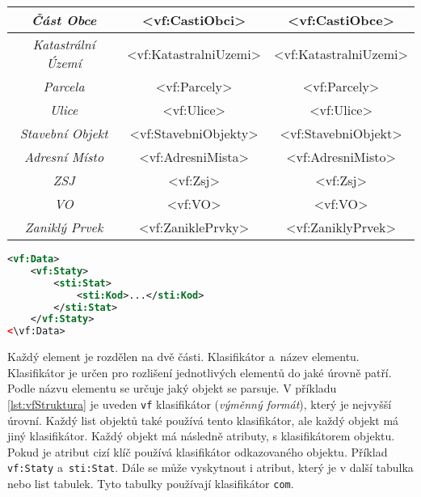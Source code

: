 \begin{table}[!h]
\begin{tabular}{|c|c|c|}
    \textit{Část Obce}                   & \textless{}vf:CastiObci\textgreater{}          & \textless{}vf:CastiObce\textgreater{}         \\ \hline
    \textit{Katastrální Území}           & \textless{}vf:KatastralniUzemi\textgreater{}   & \textless{}vf:KatastralniUzemi\textgreater{}  \\ \hline
    \textit{Parcela}                     & \textless{}vf:Parcely\textgreater{}            & \textless{}vf:Parcely\textgreater{}           \\ \hline
    \textit{Ulice}                       & \textless{}vf:Ulice\textgreater{}              & \textless{}vf:Ulice\textgreater{}             \\ \hline
    \textit{Stavební Objekt}             & \textless{}vf:StavebniObjekty\textgreater{}    & \textless{}vf:StavebniObjekt\textgreater{}    \\ \hline
    \textit{Adresní Místo}               & \textless{}vf:AdresniMista\textgreater{}       & \textless{}vf:AdresniMisto\textgreater{}      \\ \hline
    \textit{ZSJ}                         & \textless{}vf:Zsj\textgreater{}                & \textless{}vf:Zsj\textgreater{}               \\ \hline
    \textit{VO}                          & \textless{}vf:VO\textgreater{}                 & \textless{}vf:VO\textgreater{}                \\ \hline
    \textit{Zaniklý Prvek}               & \textless{}vf:ZaniklePrvky\textgreater{}       & \textless{}vf:ZaniklyPrvek\textgreater{}      \\ \hline
    \end{tabular}
\end{table}

\newpage

\begin{lstlisting}[language=xml, caption={Příklad XML Struktury}, label=lst:vfStruktura]
<vf:Data>
    <vf:Staty>
        <sti:Stat>
            <sti:Kod>...</sti:Kod>
        </sti:Stat>
    </vf:Staty>
<\vf:Data>
\end{lstlisting}

Každý element je rozdělen na dvě části.
Klasifikátor a~název elementu.
Klasifikátor je určen pro rozlišení jednotlivých elementů do jaké úrovně patří.
Podle názvu elementu se určuje jaký objekt se parsuje.
V příkladu \ref{lst:vfStruktura} je uveden \texttt{vf} klasifikátor (\textit{výměnný formát}), který je nejvyšší úrovní.
Každý list objektů také používá tento klasifikátor, ale každý objekt má jiný klasifikátor.
Každý objekt má následně atributy, s klasifikátorem objektu. Pokud je atribut cizí klíč používá klasifikátor odkazovaného objektu.
Příklad \texttt{vf:Staty} a~\texttt{sti:Stat}.
Dále se může vyskytnout i atribut, který je v další tabulka nebo list tabulek. Tyto tabulky používají klasifikátor \texttt{com}.

